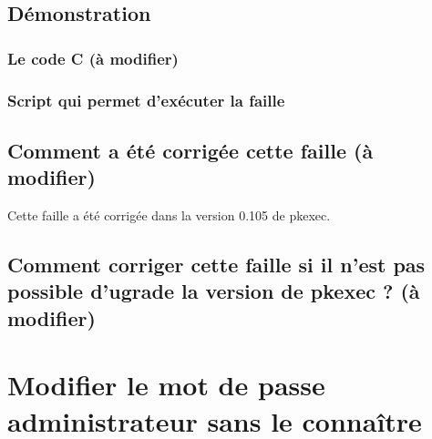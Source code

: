 \documentclass[a4paper, 12pt]{article}
\begin{document}
   		
   		\newpage
   		\subsection{Démonstration}
			\subsubsection{Le code C (à modifier) } 
			  
				
			\subsubsection{Script qui permet d'exécuter la faille}   	
			
		\subsection{Comment a été corrigée cette faille (à modifier)}
		Cette faille a été corrigée dans la version 0.105 de pkexec.
            \subsection{Comment corriger cette faille si il n'est pas possible d'ugrade la version de pkexec ? (à modifier)}

   \section{Modifier le mot de passe administrateur sans le connaître}
        
\end{document}

